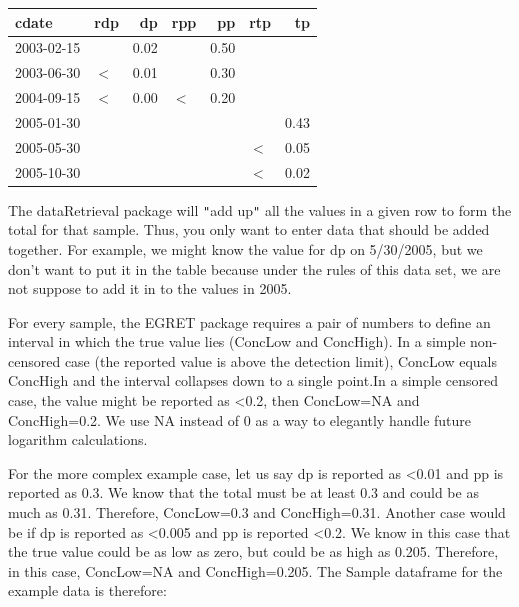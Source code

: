 \documentclass[a4paper,11pt]{article}
\begin{document}
\begin{center}

\begin{tabular}{llrlrlr}
  \hline
cdate & rdp & dp & rpp & pp & rtp & tp \\ 
  \hline
2003-02-15 &  & 0.02 &  & 0.50 &  &  \\ 
  2003-06-30 & $<$ & 0.01 &  & 0.30 &  &  \\ 
  2004-09-15 & $<$ & 0.00 & $<$ & 0.20 &  &  \\ 
  2005-01-30 &  &  &  &  &  & 0.43 \\ 
  2005-05-30 &  &  &  &  & $<$ & 0.05 \\ 
  2005-10-30 &  &  &  &  & $<$ & 0.02 \\ 
   \hline
\end{tabular}
\end{center}


The dataRetrieval package will \texttt{"}add up\texttt{"} all the values in a given row to form the total for that sample. Thus, you only want to enter data that should be added together. For example, we might know the value for dp on 5/30/2005, but we don't want to put it in the table because under the rules of this data set, we are not suppose to add it in to the values in 2005.

For every sample, the EGRET package requires a pair of numbers to define an interval in which the true value lies (ConcLow and ConcHigh). In a simple non-censored case (the reported value is above the detection limit), ConcLow equals ConcHigh and the interval collapses down to a single point.In a simple censored case, the value might be reported as <0.2, then ConcLow=NA and ConcHigh=0.2. We use NA instead of 0 as a way to elegantly handle future logarithm calculations.

For the more complex example case, let us say dp is reported as <0.01 and pp is reported as 0.3. We know that the total must be at least 0.3 and could be as much as 0.31. Therefore, ConcLow=0.3 and ConcHigh=0.31. Another case would be if dp is reported as <0.005 and pp is reported <0.2. We know in this case that the true value could be as low as zero, but could be as high as 0.205. Therefore, in this case, ConcLow=NA and ConcHigh=0.205. The Sample dataframe for the example data is therefore:
\end{document}
